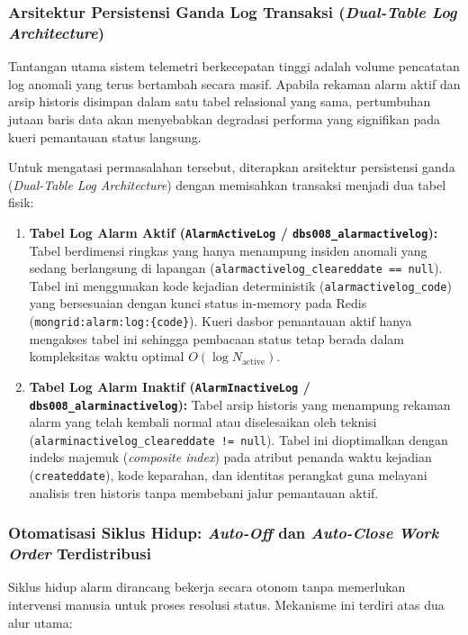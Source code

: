 \subsubsection{Arsitektur Persistensi Ganda Log Transaksi (\textit{Dual-Table Log Architecture})}

Tantangan utama sistem telemetri berkecepatan tinggi adalah volume pencatatan log anomali yang terus bertambah secara masif. Apabila rekaman alarm aktif dan arsip historis disimpan dalam satu tabel relasional yang sama, pertumbuhan jutaan baris data akan menyebabkan degradasi performa yang signifikan pada kueri pemantauan status langsung.

Untuk mengatasi permasalahan tersebut, diterapkan arsitektur persistensi ganda (\textit{Dual-Table Log Architecture}) dengan memisahkan transaksi menjadi dua tabel fisik:

\begin{enumerate}[label=\arabic*., leftmargin=*, itemsep=0pt]
  \item \textbf{Tabel Log Alarm Aktif (\texttt{AlarmActiveLog} / \texttt{dbs008\_alarmactivelog}):} Tabel berdimensi ringkas yang hanya menampung insiden anomali yang sedang berlangsung di lapangan (\texttt{alarmactivelog\_cleareddate == null}). Tabel ini menggunakan kode kejadian deterministik (\texttt{alarmactivelog\_code}) yang bersesuaian dengan kunci status in-memory pada Redis (\texttt{mongrid:alarm:log:\{code\}}). Kueri dasbor pemantauan aktif hanya mengakses tabel ini sehingga pembacaan status tetap berada dalam kompleksitas waktu optimal $O(\log N_{\text{active}})$.
  \item \textbf{Tabel Log Alarm Inaktif (\texttt{AlarmInactiveLog} / \texttt{dbs008\_alarminactivelog}):} Tabel arsip historis yang menampung rekaman alarm yang telah kembali normal atau diselesaikan oleh teknisi (\texttt{alarminactivelog\_cleareddate != null}). Tabel ini dioptimalkan dengan indeks majemuk (\textit{composite index}) pada atribut penanda waktu kejadian (\texttt{createddate}), kode keparahan, dan identitas perangkat guna melayani analisis tren historis tanpa membebani jalur pemantauan aktif.
\end{enumerate}

\subsubsection{Otomatisasi Siklus Hidup: \textit{Auto-Off} dan \textit{Auto-Close Work Order} Terdistribusi}

Siklus hidup alarm dirancang bekerja secara otonom tanpa memerlukan intervensi manusia untuk proses resolusi status. Mekanisme ini terdiri atas dua alur utama:

